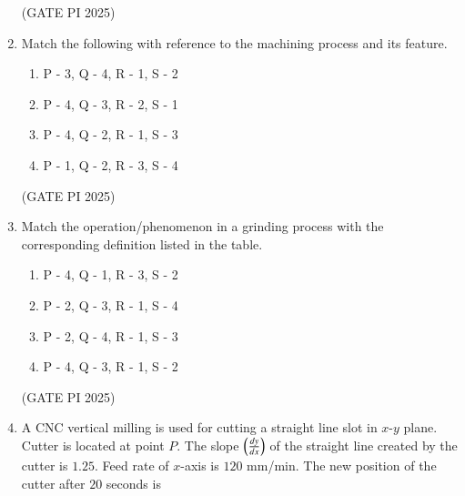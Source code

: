 \documentclass[journal,12pt,onecolumn]{IEEEtran}
\theoremstyle{remark}
\begin{document}
\begin{enumerate}
\hfill (GATE PI 2025)

\item Match the following with reference to the machining process and its feature.



\begin{enumerate}
\item P - 3, Q - 4, R - 1, S - 2
\item P - 4, Q - 3, R - 2, S - 1
\item P - 4, Q - 2, R - 1, S - 3
\item P - 1, Q - 2, R - 3, S - 4
\end{enumerate}

\hfill (GATE PI 2025)

\item Match the operation/phenomenon in a grinding process with the corresponding definition listed in the table.



\begin{enumerate}
\item P - 4, Q - 1, R - 3, S - 2
\item P - 2, Q - 3, R - 1, S - 4
\item P - 2, Q - 4, R - 1, S - 3
\item P - 4, Q - 3, R - 1, S - 2
\end{enumerate}

\hfill (GATE PI 2025)

\item A CNC vertical milling is used for cutting a straight line slot in $x$-$y$ plane. Cutter is located at point $P$. The slope $\left(\frac{dy}{dx}\right)$ of the straight line created by the cutter is $1.25$. Feed rate of $x$-axis is $120$ mm/min. The new position of the cutter after $20$ seconds is

\begin{figure}[H]
\centering
{}
\caption{}
\end{figure}

\begin{enumerate}
\end{enumerate}


\end{enumerate}
\end{document}
